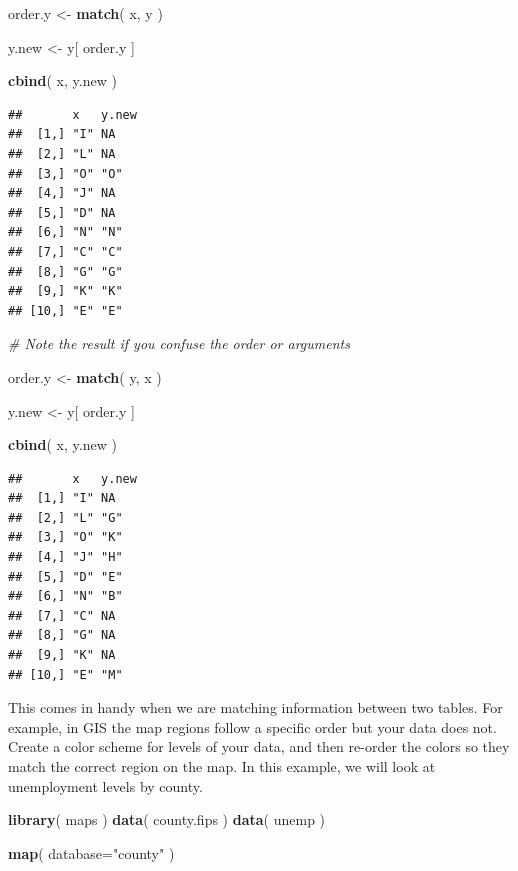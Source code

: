 \documentclass[]{book}
\newenvironment{Shaded}{\begin{snugshade}}{\end{snugshade}}
\newcommand{\CommentTok}[1]{\textcolor[rgb]{0.56,0.35,0.01}{\textit{#1}}}
\newcommand{\DataTypeTok}[1]{\textcolor[rgb]{0.13,0.29,0.53}{#1}}
\newcommand{\KeywordTok}[1]{\textcolor[rgb]{0.13,0.29,0.53}{\textbf{#1}}}
\newcommand{\NormalTok}[1]{#1}
\newcommand{\StringTok}[1]{\textcolor[rgb]{0.31,0.60,0.02}{#1}}
\theoremstyle{definition}
\theoremstyle{definition}
\theoremstyle{definition}
\theoremstyle{remark}
\begin{document}
\begin{Shaded}
\begin{Highlighting}[]
\NormalTok{order.y <-}\StringTok{ }\KeywordTok{match}\NormalTok{( x, y )}

\NormalTok{y.new <-}\StringTok{ }\NormalTok{y[ order.y ]}

\KeywordTok{cbind}\NormalTok{( x, y.new )}
\end{Highlighting}
\end{Shaded}

\begin{verbatim}
##       x   y.new
##  [1,] "I" NA   
##  [2,] "L" NA   
##  [3,] "O" "O"  
##  [4,] "J" NA   
##  [5,] "D" NA   
##  [6,] "N" "N"  
##  [7,] "C" "C"  
##  [8,] "G" "G"  
##  [9,] "K" "K"  
## [10,] "E" "E"
\end{verbatim}

\begin{Shaded}
\begin{Highlighting}[]
\CommentTok{# Note the result if you confuse the order or arguments}

\NormalTok{order.y <-}\StringTok{ }\KeywordTok{match}\NormalTok{( y, x )}

\NormalTok{y.new <-}\StringTok{ }\NormalTok{y[ order.y ]}

\KeywordTok{cbind}\NormalTok{( x, y.new )}
\end{Highlighting}
\end{Shaded}

\begin{verbatim}
##       x   y.new
##  [1,] "I" NA   
##  [2,] "L" "G"  
##  [3,] "O" "K"  
##  [4,] "J" "H"  
##  [5,] "D" "E"  
##  [6,] "N" "B"  
##  [7,] "C" NA   
##  [8,] "G" NA   
##  [9,] "K" NA   
## [10,] "E" "M"
\end{verbatim}

This comes in handy when we are matching information between two tables.
For example, in GIS the map regions follow a specific order but your
data does not. Create a color scheme for levels of your data, and then
re-order the colors so they match the correct region on the map. In this
example, we will look at unemployment levels by county.

\begin{Shaded}
\begin{Highlighting}[]
\KeywordTok{library}\NormalTok{( maps )}
\KeywordTok{data}\NormalTok{( county.fips )}
\KeywordTok{data}\NormalTok{( unemp )}

\KeywordTok{map}\NormalTok{( }\DataTypeTok{database=}\StringTok{"county"}\NormalTok{ )}
\end{Highlighting}
\end{Shaded}
\end{document}
